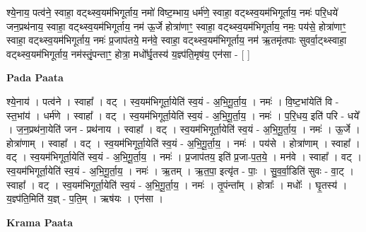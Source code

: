 \documentclass[17pt]{extarticle}
\begin{document}
श्ये॒नाय॒ पत्व॑ने॒ स्वाहा॒ वट्थ्स्व॒यम॑भिगूर्ताय॒ नमो॑ विष्ट॒म्भाय॒ धर्म॑णे॒ स्वाहा॒ वट्थ्स्व॒यम॑भिगूर्ताय॒ नमः॑ परि॒धये॑ जन॒प्रथ॑नाय॒ स्वाहा॒ वट्थ्स्व॒यम॑भिगूर्ताय॒ नम॑ ऊ॒र्जे होत्रा॑णाꣳ॒॒ स्वाहा॒ वट्थ्स्व॒यम॑भिगूर्ताय॒ नमः॒ पय॑से॒ होत्रा॑णाꣳ॒॒ स्वाहा॒ वट्थ्स्व॒यम॑भिगूर्ताय॒ नमः॑ प्र॒जाप॑तये॒ मन॑वे॒ स्वाहा॒ वट्थ्स्व॒यम॑भिगूर्ताय॒ नम॑ ऋ॒तमृ॑तपाः सुवर्वा॒ट्थ्स्वाहा॒ वट्थ्स्व॒यम॑भिगूर्ताय॒ नम॑स्तृं॒पन्ताꣳ॒॒ होत्रा॒ मधो᳚र्घृ॒तस्य॑ य॒ज्ञ्प॑ति॒मृष॑य॒ एन॑सा - [  ] \newline

\textbf{Pada Paata} \newline

श्ये॒नाय॑ । पत्व॑ने । स्वाहा᳚ । वट् । स्व॒यम॑भिगूर्ता॒येति॑ स्व॒यं - अ॒भि॒गू॒र्ता॒य॒ । नमः॑ । वि॒ष्ट॒भांयेति॑ वि - स्त॒भांय॑ । धर्म॑णे । स्वाहा᳚ । वट् । स्व॒यम॑भिगूर्ता॒येति॑ स्व॒यं - अ॒भि॒गू॒र्ता॒य॒ । नमः॑ । प॒रि॒धय॒ इति॑ परि - धये᳚ । ज॒न॒प्रथ॑ना॒येति॑ जन - प्रथ॑नाय । स्वाहा᳚ । वट् । स्व॒यम॑भिगूर्ता॒येति॑ स्व॒यं - अ॒भि॒गू॒र्ता॒य॒ । नमः॑ । ऊ॒र्जे । होत्रा॑णाम् । स्वाहा᳚ । वट् । स्व॒यम॑भिगूर्ता॒येति॑ स्व॒यं - अ॒भि॒गू॒र्ता॒य॒ । नमः॑ । पय॑से । होत्रा॑णाम् । स्वाहा᳚ । वट् । स्व॒यम॑भिगूर्ता॒येति॑ स्व॒यं - अ॒भि॒गू॒र्ता॒य॒ । नमः॑ । प्र॒जाप॑तय॒ इति॑ प्र॒जा-प॒त॒ये॒ । मन॑वे । स्वाहा᳚ । वट् । स्व॒यम॑भिगूर्ता॒येति॑ स्व॒यं - अ॒भि॒गू॒र्ता॒य॒ । नमः॑ । ऋ॒तम् । ऋ॒त॒पा॒ इत्यृ॑त - पाः॒ । सु॒व॒र्वा॒डिति॑ सुवः - वा॒ट् । स्वाहा᳚ । वट् । स्व॒यम॑भिगूर्ता॒येति॑ स्व॒यं - अ॒भि॒गू॒र्ता॒य॒ । नमः॑ । तृ॒पंन्ता᳚म् । होत्राः᳚ । मधोः᳚ । घृ॒तस्य॑ । य॒ज्ञ्प॑ति॒मिति॑ य॒ज्ञ् - प॒ति॒म् । ऋष॑यः । एन॑सा ।  \newline


\textbf{Krama Paata} \newline
\end{document}
